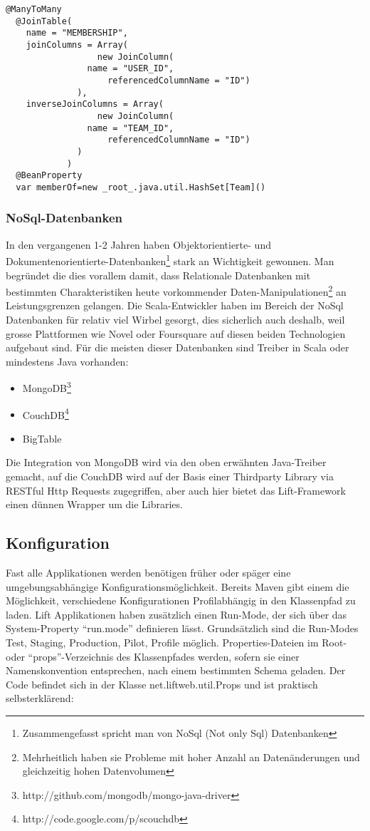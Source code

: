 \begin{lstlisting}[caption=Relation Mapping mit JPA]
@ManyToMany
  @JoinTable(
    name = "MEMBERSHIP",
    joinColumns = Array(
    			  new JoinColumn(
			    name = "USER_ID", 
    			    referencedColumnName = "ID")
			  ),
    inverseJoinColumns = Array(
    			  new JoinColumn(
  		  	    name = "TEAM_ID",
    			    referencedColumnName = "ID")
			  )
			)
  @BeanProperty
  var memberOf=new _root_.java.util.HashSet[Team]()
  \end{lstlisting}
  
\subsubsection{NoSql-Datenbanken}
In den vergangenen 1-2 Jahren haben Objektorientierte- und Dokumentenorientierte-Datenbanken\footnote{Zusammengefasst spricht man von NoSql (Not only Sql) Datenbanken} stark an Wichtigkeit gewonnen. Man\cite{wiki:NoSQL} begr\"undet die dies vorallem damit, dass Relationale Datenbanken mit bestimmten Charakteristiken heute vorkommender Daten-Manipulationen\footnote{Mehrheitlich haben sie Probleme mit hoher Anzahl an Daten\"anderungen und gleichzeitig hohen Datenvolumen} an Leistungsgrenzen gelangen.
Die Scala-Entwickler haben im Bereich der NoSql Datenbanken f\"ur relativ viel Wirbel gesorgt, dies sicherlich auch deshalb, weil grosse Plattformen wie Novel oder Foursquare auf diesen beiden Technologien aufgebaut sind. F\"ur die meisten dieser Datenbanken sind Treiber in Scala oder mindestens Java vorhanden:
\begin{itemize}
\item MongoDB\footnote{http://github.com/mongodb/mongo-java-driver}
\item CouchDB\footnote{http://code.google.com/p/scouchdb}
\item BigTable
\end{itemize}

Die Integration von MongoDB wird via den oben erw\"ahnten Java-Treiber gemacht, auf die CouchDB wird auf der Basis einer Thirdparty Library via RESTful Http Requests zugegriffen, aber auch hier bietet das Lift-Framework einen d\"unnen Wrapper um die Libraries.

\subsection{Konfiguration}
Fast alle Applikationen werden ben\"otigen fr\"uher oder sp\"ager eine umgebungsabh\"angige Konfigurationsm\"oglichkeit. Bereits Maven gibt einem die M\"oglichkeit, verschiedene Konfigurationen Profilabh\"angig in den Klassenpfad zu laden. Lift Applikationen haben zus\"atzlich einen Run-Mode, der sich \"uber das System-Property ``run.mode'' definieren l\"asst. Grunds\"atzlich sind die Run-Modes Test, Staging, Production, Pilot, Profile m\"oglich. Properties-Dateien im Root- oder ``props''-Verzeichnis des Klassenpfades werden, sofern sie einer Namenskonvention entsprechen, nach einem bestimmten Schema geladen. Der Code befindet sich in der Klasse net.liftweb.util.Props und ist praktisch selbsterkl\"arend:

